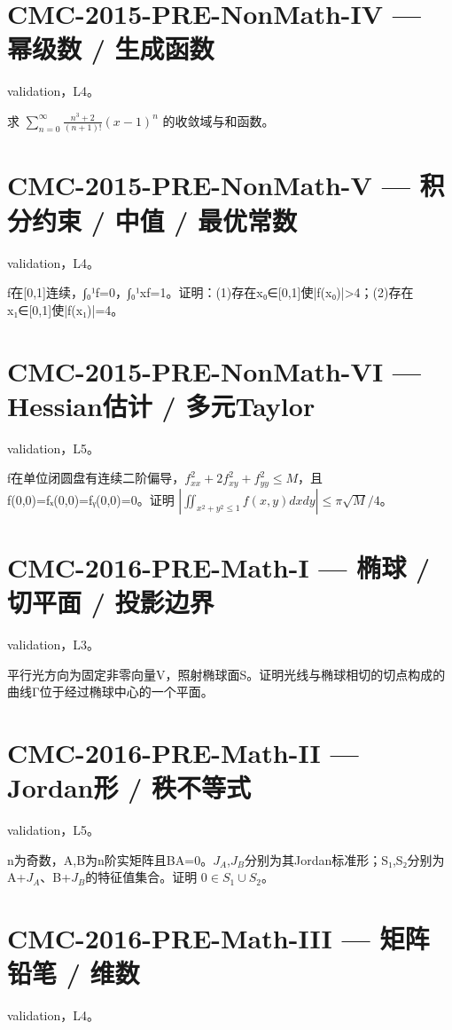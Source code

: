 \documentclass[UTF8]{ctexart}
\begin{document}
\section*{CMC-2015-PRE-NonMath-IV — 幂级数 / 生成函数}

validation，L4。

求 $\sum_{n=0}^\infty\frac{n^3+2}{(n+1)!}(x-1)^n$ 的收敛域与和函数。

\section*{CMC-2015-PRE-NonMath-V — 积分约束 / 中值 / 最优常数}

validation，L4。

f在[0,1]连续，∫₀¹f=0，∫₀¹xf=1。证明：(1)存在x₀∈[0,1]使|f(x₀)|>4；(2)存在x₁∈[0,1]使|f(x₁)|=4。

\section*{CMC-2015-PRE-NonMath-VI — Hessian估计 / 多元Taylor}

validation，L5。

f在单位闭圆盘有连续二阶偏导，$f_{xx}^2+2f_{xy}^2+f_{yy}^2\le M$，且f(0,0)=fₓ(0,0)=fᵧ(0,0)=0。证明 $|\iint_{x^2+y^2\le1}f(x,y)dxdy|\le\pi\sqrt M/4$。

\section*{CMC-2016-PRE-Math-I — 椭球 / 切平面 / 投影边界}

validation，L3。

平行光方向为固定非零向量V，照射椭球面S。证明光线与椭球相切的切点构成的曲线Γ位于经过椭球中心的一个平面。

\section*{CMC-2016-PRE-Math-II — Jordan形 / 秩不等式}

validation，L5。

n为奇数，A,B为n阶实矩阵且BA=0。$J_A$,$J_B$分别为其Jordan标准形；S₁,S₂分别为A+$J_A$、B+$J_B$的特征值集合。证明 $0\in S_1\cup S_2$。

\section*{CMC-2016-PRE-Math-III — 矩阵铅笔 / 维数}

validation，L4。
\end{document}
